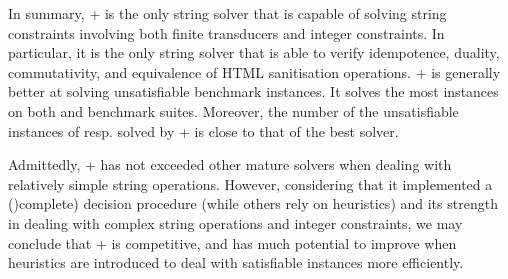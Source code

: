 In summary, 
{\ostrich}+ is the only string solver that is capable of solving string constraints involving both finite transducers and integer constraints. In particular, it is the only string solver that is able to verify idempotence, duality, commutativity, and equivalence of HTML sanitisation operations.
%
{\ostrich}+ is generally better at solving unsatisfiable benchmark instances. It solves the most instances on both {\slogbenchra} and {\slogbenchr} benchmark suites. Moreover, the number of the unsatisfiable instances of {\pyexbench} resp. {\kaluzabench} solved by {\ostrich}+ is close to that of the best solver. %

Admittedly, {\ostrich}+ has not exceeded other mature solvers when dealing with relatively simple string operations. However, considering that it implemented a ()complete) decision procedure (while others rely on heuristics) and its strength in dealing with complex string operations and integer constraints, we may conclude that {\ostrich}+ is competitive, and has much potential to improve when heuristics are introduced to deal with  satisfiable  instances more efficiently. 




